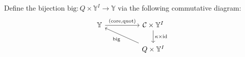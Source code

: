 \documentclass{amsart}
\newcommand{\Z}{\mathbb{Z}}
\newcommand{\Y}{\mathbb{Y}}
\newcommand{\cC}{\mathcal{C}}
\newcommand{\kb}{\kappa}
\newcommand{\la}{\lambda}
\newcommand{\lad}{{\lambda^\bullet}}
\newcommand{\mud}{{\mu^\bullet}}
\newcommand{\core}{\mathrm{core}}
\newcommand{\id}{\mathrm{id}}
\newcommand{\quot}{\mathrm{quot}}
\newcommand{\Symaf}{\hat{\mathfrak{S}}}
\newcommand{\tra}{\,{}^T\!}
\newcommand{\dom}{\trianglerighteq}
\newcommand{\bigp}{\mathrm{big}}
\newtheorem{lem}[thm]{Lemma}
\theoremstyle{remark}
\newtheorem{ex}[thm]{Example}
\numberwithin{thm}{section}
\numberwithin{equation}{section}
\begin{document}
Define the bijection $\bigp:Q\times \Y^I\to \Y$ via the following commutative diagram:
\begin{equation}\label{E:big}
\begin{tikzcd} 
\Y \arrow[rr,"{(\core,\quot)}"]& & \cC\times \Y^I \arrow[d,"\kb\times \id"]\\ && Q\times \Y^I\arrow[ull,"\bigp"] 
\end{tikzcd}
\end{equation}



\end{document}
